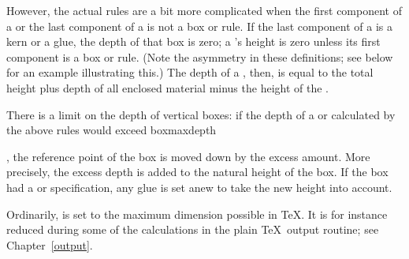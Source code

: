 \documentclass{book}
\begin{document}
However, the actual rules are a bit
more complicated when the first component of a 
or the last component of a  is not a box or rule.
If the last component of a  is a kern or a glue,
the depth of that box is zero; a 's
height is zero
unless its first component is a box or rule.
\altt
(Note the asymmetry in these definitions; see below for
an example illustrating this.)
The depth of a , then, is equal to the total
height plus depth of all enclosed material minus
the height of the .

There is a limit on the depth of vertical boxes:
if the depth of a  or 
calculated by the above rules would exceed
\cstoidx boxmaxdepth\par,
the reference point of the box
is moved down by the excess amount.
More precisely, the excess depth is added to the
natural height of the box. If the box had a  or
 specification, any glue is set anew to take
the new height into account.

Ordinarily,
 is set to the maximum dimension
possible in \TeX. It is for instance reduced during some of
the calculations  in the plain \TeX\ output routine;
see Chapter~\ref{output}.

\end{document}
